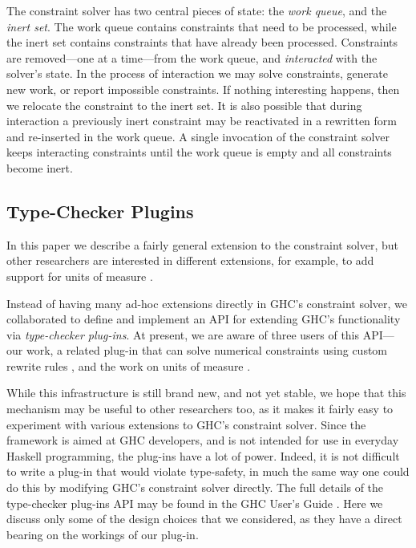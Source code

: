 \documentclass{sigplanconf}
\begin{document}
The constraint solver has two central pieces of state: the {\em work queue},
and the {\em inert set}.  The work queue contains constraints that need to be
processed, while the inert set contains constraints that have already
been processed.  Constraints are removed---one at a time---from the work queue,
and {\em interacted} with the solver's state.  In the process of interaction
we may solve constraints, generate new work, or report impossible constraints.
If nothing interesting happens, then we relocate the constraint to the
inert set.  It is also possible that during interaction a previously
inert constraint may be reactivated in a rewritten form and re-inserted
in the work queue.  A single invocation of the constraint solver keeps
interacting constraints until the work queue is empty and all constraints
become inert.

\subsection{Type-Checker Plugins}
In this paper we describe a fairly general extension to the constraint
solver, but other researchers are interested in different extensions,
for example, to add support for units of measure \cite{units-of-measure}.

Instead of having many ad-hoc extensions directly in GHC's constraint solver,
we collaborated to define and implement an API for extending GHC's
functionality via {\em type-checker plug-ins}.  At present, we are aware
of three users of this API---our work, a related plug-in that can
solve numerical constraints using custom rewrite rules
\cite{typelits-normalise},
and the work on units of measure \cite{units-of-measure}.

While this infrastructure is still brand new, and not yet stable,
we hope that this mechanism may be useful to other researchers too,
as it makes it fairly easy to experiment with various extensions to
GHC's constraint solver.  Since the framework is aimed at GHC developers,
and is not intended for use in everyday Haskell programming, the plug-ins
have a lot of power.  Indeed, it is not difficult to write a plug-in
that would violate type-safety, in much the same way one could do this
by modifying GHC's constraint solver directly.  The full details of
the type-checker plug-ins API may be found in the GHC User's Guide
\cite{ghc-manual}. Here we discuss only some
of the design choices that we considered, as they have a direct
bearing on the workings of our plug-in.
\end{document}
